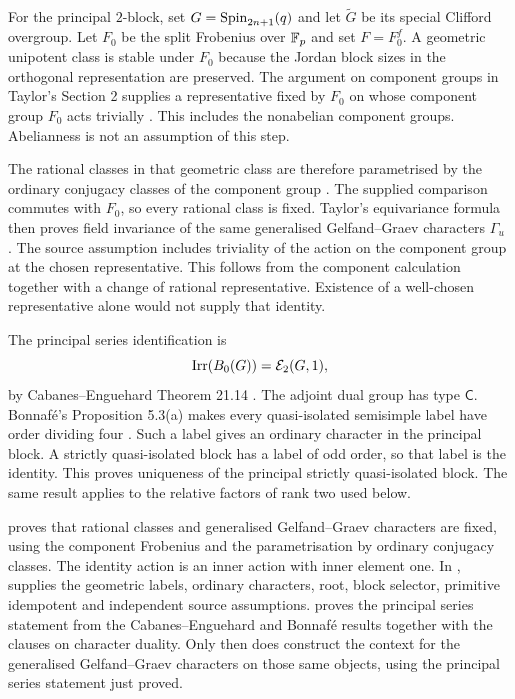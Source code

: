 For the principal $2$-block, set $G=\operatorname{Spin}_{2n+1}(q)$ and let
$\widetilde G$ be its special Clifford overgroup. Let $F_0$ be the split
Frobenius over $\mathbb F_p$ and set $F=F_0^f$. A geometric unipotent class is stable under
$F_0$ because the Jordan block sizes in the orthogonal representation
are preserved. The argument on component groups in Taylor's Section 2
supplies a representative fixed by $F_0$ on whose component group
$F_0$ acts trivially \cite{Taylor2013}. This includes the nonabelian
component groups. Abelianness is not an assumption of this step.

The rational classes in that geometric class are therefore parametrised
by the ordinary conjugacy classes of the component group
\cite[Theorem~21.11]{MalleTesterman2011}. The supplied comparison
commutes with $F_0$, so every rational class is fixed. Taylor's
equivariance formula then proves field invariance of the same
generalised Gelfand--Graev characters $\Gamma_u$
\cite[Proposition~11.10]{Taylor2018Automorphisms}.
The source assumption includes triviality of the action on the component
group at the chosen representative. This follows from the component
calculation together with a change of rational representative. Existence
of a well-chosen representative alone would not supply that identity.

The principal series identification is
\[
 \operatorname{Irr}(B_0(G))=\mathcal E_2(G,1),
\]
by Cabanes--Enguehard Theorem 21.14 \cite{CabanesEnguehard2004}.
The adjoint dual group has type $\mathsf C$. Bonnaf\'e's
Proposition 5.3(a) makes every quasi-isolated semisimple label have
order dividing four \cite{Bonnafe2005}. Such a label gives an
ordinary character in the principal block. A strictly quasi-isolated
block has a label of odd order, so that label is the identity.
This proves uniqueness of the principal strictly quasi-isolated block.
The same result applies to the relative factors of rank two used below.

\begin{implementation}
 proves that rational classes
and generalised Gelfand--Graev characters are fixed, using the component Frobenius and the parametrisation
by ordinary conjugacy classes. The identity action is an inner action
with inner element one.
In ,
 supplies the geometric labels, ordinary
characters, root, block selector, primitive idempotent and independent
source assumptions.  proves the
principal series statement from the Cabanes--Enguehard and Bonnaf\'e
results together with the clauses on character duality. Only then does
 construct the context for the generalised Gelfand--Graev characters on those same objects,
using the principal series statement just proved.
\end{implementation}

